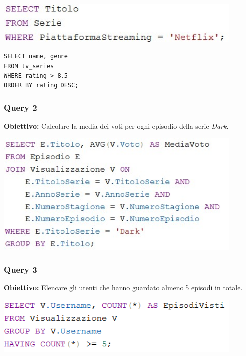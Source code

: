 \documentclass[12pt,a4paper]{article}
\begin{document}
\vspace{0.5cm}
\begin{center}
\includegraphics[width=0.9\textwidth]{Query1.jpg}
\end{center}


\begin{lstlisting}[caption={Esempio di query SQL}, label={lst:sql-example}]
SELECT name, genre
FROM tv_series
WHERE rating > 8.5
ORDER BY rating DESC;
\end{lstlisting}

\vspace{1cm}

\subsubsection*{Query 2 }
\textbf{Obiettivo:} Calcolare la media dei voti per ogni episodio della serie \textit{Dark}.

\vspace{0.5cm}
\begin{center}
\includegraphics[width=0.9\textwidth]{Query2.jpg}
\end{center}

\vspace{1cm}

\subsubsection*{Query 3}
\textbf{Obiettivo:} Elencare gli utenti che hanno guardato almeno 5 episodi in totale.

\vspace{0.5cm}
\begin{center}
\includegraphics[width=0.9\textwidth]{Query3.png}
\end{center}
\end{document}
